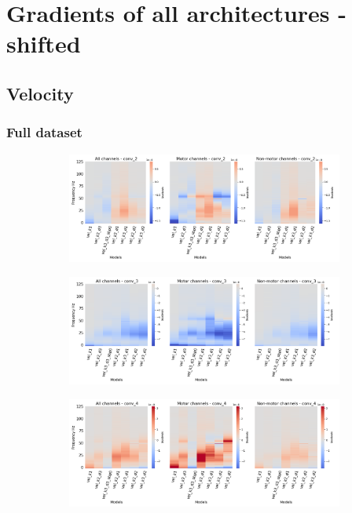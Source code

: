 \chapter{Gradients of all architectures - shifted}\label{appendixB}

\section*{Velocity}\label{sec:velocity-appendixB}

\subsection*{Full dataset}\label{subsec:vel-full-dataset-appendixB}
\begin{figure}[!htpb]
\centering
\begin{subfigure}[b]{\textwidth}
   \includegraphics[width=1\linewidth]{img/appendix/A/conv-2/sm/vel-model-gradients-all_kinds}
   \caption{}
   \label{fig:vel-shifted-grads-conv-2}
\end{subfigure}

\begin{subfigure}[b]{\textwidth}
   \includegraphics[width=1\linewidth]{img/appendix/A/conv-3/sm/vel-model-gradients-all_kinds}
   \caption{}
   \label{fig:vel-shifted-grads-conv-3}
\end{subfigure}

\begin{subfigure}[b]{\textwidth}
   \includegraphics[width=1\linewidth]{img/appendix/A/conv-4/sm/vel-model-gradients_all_kinds}
   \caption{}
   \label{fig:vel-shifted-grads-conv-4}
\end{subfigure}


\end{figure}
